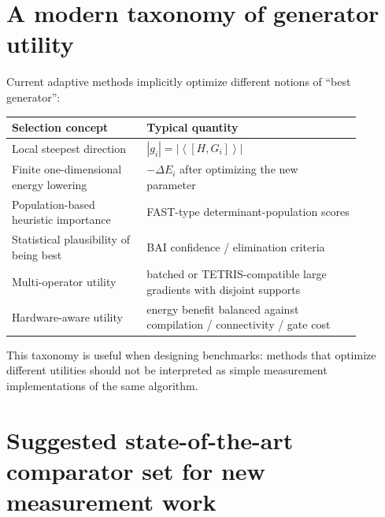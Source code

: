 \documentclass[11pt]{article}
\newcommand{\expect}[1]{\left\langle #1\right\rangle}
\begin{document}
\section{A modern taxonomy of generator utility}

Current adaptive methods implicitly optimize different notions of ``best generator'':
\begin{center}
\begin{tabular}{p{0.34\linewidth}p{0.54\linewidth}}
\toprule
Selection concept & Typical quantity \\
\midrule
Local steepest direction & $|g_i|=|\expect{[H,G_i]}|$ \\
Finite one-dimensional energy lowering & $-\Delta E_i$ after optimizing the new parameter \\
Population-based heuristic importance & FAST-type determinant-population scores \\
Statistical plausibility of being best & BAI confidence / elimination criteria \\
Multi-operator utility & batched or TETRIS-compatible large gradients with disjoint supports \\
Hardware-aware utility & energy benefit balanced against compilation / connectivity / gate cost \\
\bottomrule
\end{tabular}
\end{center}
This taxonomy is useful when designing benchmarks: methods that optimize different utilities should not be interpreted as simple measurement implementations of the same algorithm.

\section{Suggested state-of-the-art comparator set for new measurement work}
\end{document}

